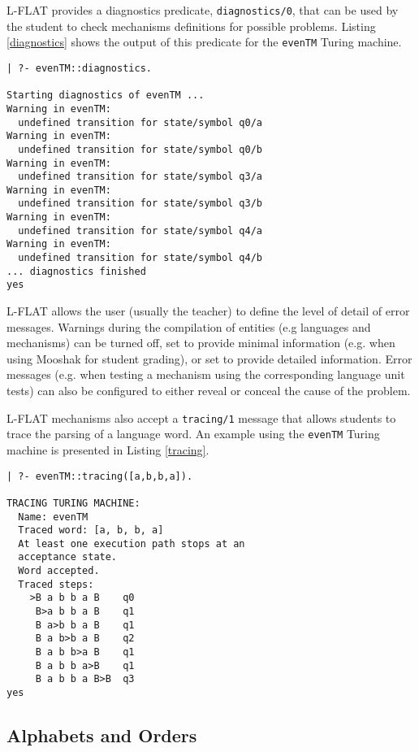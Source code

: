 \documentclass{llncs}
\begin{document}
\noindent
L-FLAT provides a diagnostics predicate, \lstinline{diagnostics/0}, that can be used by the student to check mechanisms definitions for possible problems. Listing \ref{diagnostics} shows the output of this predicate for the \lstinline{evenTM} Turing machine.

\begin{lstlisting}[caption={Running \lstinline{diagnostics/0} on the \lstinline{evenTM} Turing machine}, label=diagnostics]
| ?- evenTM::diagnostics.

Starting diagnostics of evenTM ...
Warning in evenTM:
  undefined transition for state/symbol q0/a
Warning in evenTM:
  undefined transition for state/symbol q0/b
Warning in evenTM:
  undefined transition for state/symbol q3/a
Warning in evenTM:
  undefined transition for state/symbol q3/b
Warning in evenTM:
  undefined transition for state/symbol q4/a
Warning in evenTM:
  undefined transition for state/symbol q4/b
... diagnostics finished
yes
\end{lstlisting}

\noindent
L-FLAT allows the user (usually the teacher) to define the level of detail of error messages. Warnings during the compilation of entities (e.g languages and mechanisms) can be turned off, set to provide minimal information (e.g. when using Mooshak for student grading), or set to provide detailed information. Error messages (e.g. when testing a mechanism using the corresponding language unit tests) can also be configured to either reveal or conceal the cause of the problem.

L-FLAT mechanisms also accept a \lstinline{tracing/1} message that allows students to trace the parsing of a language word. An example using the \lstinline{evenTM} Turing machine is presented in Listing \ref{tracing}.

\begin{lstlisting}[caption={Tracing  parsing a \lstinline{evenL} word using the \lstinline{evenTM} Turing machine}, label=tracing]
| ?- evenTM::tracing([a,b,b,a]).

TRACING TURING MACHINE:
  Name: evenTM
  Traced word: [a, b, b, a]
  At least one execution path stops at an
  acceptance state.
  Word accepted.
  Traced steps:
    >B a b b a B	q0
     B>a b b a B	q1
     B a>b b a B	q1
     B a b>b a B	q2
     B a b b>a B	q1
     B a b b a>B	q1
     B a b b a B>B	q3
yes
\end{lstlisting}


\subsection{Alphabets and Orders}
\end{document}
